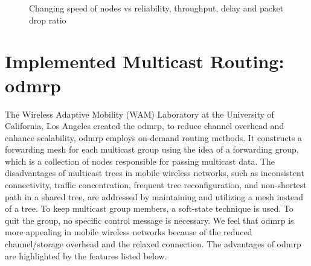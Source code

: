 \begin{figure}[!htbp]
    \caption{Changing speed of nodes vs reliability, throughput, delay and packet drop ratio}
    \label{fig:mobility-vs}
\end{figure}

\section{Implemented Multicast Routing: \acrshort{odmrp}}
The Wireless Adaptive Mobility (WAM) Laboratory at the University of California, Los Angeles created the \acrfull{odmrp}, to reduce channel overhead and enhance scalability, \acrshort{odmrp} employs on-demand routing methods.
It constructs a forwarding mesh for each multicast group using the idea of a forwarding group, which is a collection of nodes responsible for passing multicast data.
The disadvantages of multicast trees in mobile wireless networks, such as inconsistent connectivity, traffic concentration, frequent tree reconfiguration, and non-shortest path in a shared tree, are addressed by maintaining and utilizing a mesh instead of a tree.
To keep multicast group members, a soft-state technique is used.
To quit the group, no specific control message is necessary.
We feel that \acrshort{odmrp} is more appealing in mobile wireless networks because of the reduced channel/storage overhead and the relaxed connection.
The advantages of \acrshort{odmrp} are highlighted by the features listed below.

